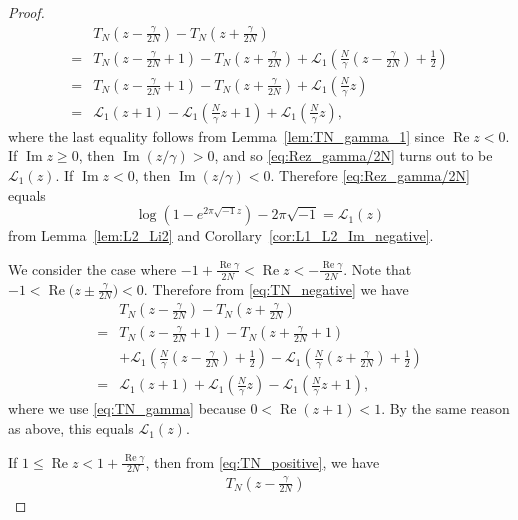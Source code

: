 \documentclass[a4paper,dvipdfmx]{amsart}
\theoremstyle{plain}
\theoremstyle{definition}
\theoremstyle{remark}
\renewcommand{\L}{\mathcal{L}}
\renewcommand{\Re}{\operatorname{Re}}
\renewcommand{\Im}{\operatorname{Im}}
\renewcommand{\i}{\sqrt{-1}}
\numberwithin{equation}{section}
\begin{document}
\begin{proof}
\begin{equation}
\begin{split}
  &T_{N}\left(z-\frac{\gamma}{2N}\right)
  -
  T_{N}\left(z+\frac{\gamma}{2N}\right)
  \\
  =&
  T_{N}\left(z-\frac{\gamma}{2N}+1\right)
  -
  T_{N}\left(z+\frac{\gamma}{2N}\right)
  +
  \L_1\left(\frac{N}{\gamma}\left(z-\frac{\gamma}{2N}\right)+\frac{1}{2}\right)
  \\
  =&
  T_{N}\left(z-\frac{\gamma}{2N}+1\right)
  -
  T_{N}\left(z+\frac{\gamma}{2N}\right)
  +
  \L_1\left(\frac{N}{\gamma}z\right)
  \\
  =&
  \L_1(z+1)-\L_1\left(\frac{N}{\gamma}z+1\right)+\L_1\left(\frac{N}{\gamma}z\right),
\end{split}
\end{equation}
where the last equality follows from Lemma~\ref{lem:TN_gamma_1} since $\Re{z}<0$.
If $\Im{z}\ge0$, then $\Im(z/\gamma)>0$, and so \eqref{eq:Rez_gamma/2N} turns out to be $\L_1(z)$.
If $\Im{z}<0$, then $\Im(z/\gamma)<0$.
Therefore \eqref{eq:Rez_gamma/2N} equals
\begin{equation*}
  \log(1-e^{2\pi\i z})-2\pi\i
  =
  \L_1(z)
\end{equation*}
from Lemma~\ref{lem:L2_Li2} and Corollary~\ref{cor:L1_L2_Im_negative}.
\par
We consider the case where $-1+\frac{\Re\gamma}{2N}<\Re{z}<-\frac{\Re\gamma}{2N}$.
Note that $-1<\Re\bigl(z\pm\frac{\gamma}{2N}\bigr)<0$.
Therefore from \eqref{eq:TN_negative} we have
\begin{equation*}
\begin{split}
  &T_{N}\left(z-\frac{\gamma}{2N}\right)
  -
  T_{N}\left(z+\frac{\gamma}{2N}\right)
  \\
  =&
  T_{N}\left(z-\frac{\gamma}{2N}+1\right)
  -
  T_{N}\left(z+\frac{\gamma}{2N}+1\right)
  \\
  &+
  \L_1\left(\frac{N}{\gamma}\left(z-\frac{\gamma}{2N}\right)+\frac{1}{2}\right)
  -
  \L_1\left(\frac{N}{\gamma}\left(z+\frac{\gamma}{2N}\right)+\frac{1}{2}\right)
  \\
  =&
  \L_1(z+1)
  +
  \L_1\left(\frac{N}{\gamma}z\right)
  -
  \L_1\left(\frac{N}{\gamma}z+1\right),
\end{split}
\end{equation*}
where we use \eqref{eq:TN_gamma} because $0<\Re(z+1)<1$.
By the same reason as above, this equals $\L_1(z)$.
\par
If $1\le\Re{z}<1+\frac{\Re\gamma}{2N}$, then from \eqref{eq:TN_positive}, we have
\begin{align*}
  &T_{N}\left(z-\frac{\gamma}{2N}\right)

\end{align*}
\end{proof}
\end{document}
